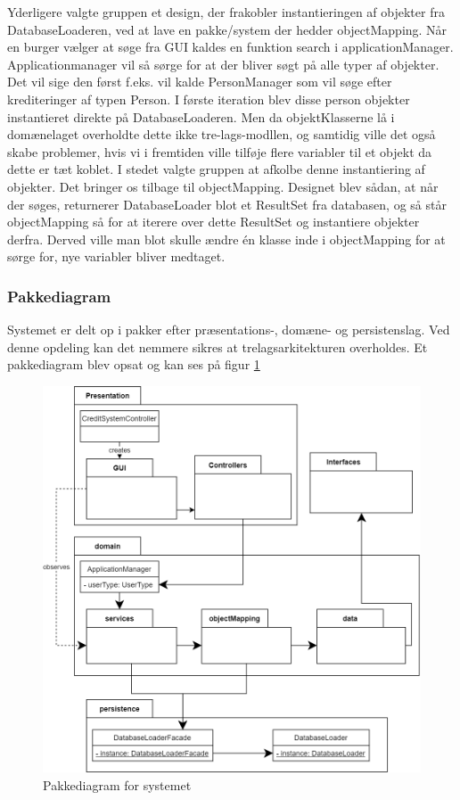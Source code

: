 Yderligere valgte gruppen et design, der frakobler instantieringen af objekter fra DatabaseLoaderen, ved at lave en pakke/system der hedder objectMapping. Når en burger vælger at søge fra GUI kaldes en funktion search i applicationManager. Applicationmanager vil så sørge for at der bliver søgt på alle typer af objekter. Det vil sige den først f.eks. vil kalde PersonManager som vil søge efter krediteringer af typen Person. I første iteration blev disse person objekter instantieret direkte på DatabaseLoaderen. Men da objektKlasserne lå i domænelaget overholdte dette ikke  tre-lags-modllen, og samtidig ville det også skabe problemer, hvis vi i fremtiden ville tilføje flere variabler til et objekt da dette er tæt koblet. I stedet valgte gruppen at afkolbe denne instantiering af objekter. Det bringer os tilbage til objectMapping. Designet blev sådan, at når der søges, returnerer DatabaseLoader blot et ResultSet fra databasen, og så står objectMapping så for at iterere over dette ResultSet og instantiere objekter derfra. Derved ville man blot skulle ændre én klasse inde i objectMapping for at sørge for, nye variabler bliver medtaget.


\subsubsection{Pakkediagram} Systemet er delt op i pakker efter præsentations-,
domæne- og persistenslag. Ved denne opdeling kan det nemmere sikres at
trelagsarkitekturen overholdes. Et pakkediagram blev opsat og kan ses på figur
\ref{fig:PackageDiagram}

\begin{figure}[H]
    \centering
\includegraphics[scale = 0.26]{images/PackageDiagram.png}
    \caption{Pakkediagram for systemet}
    \label{fig:PackageDiagram}
\end{figure}

